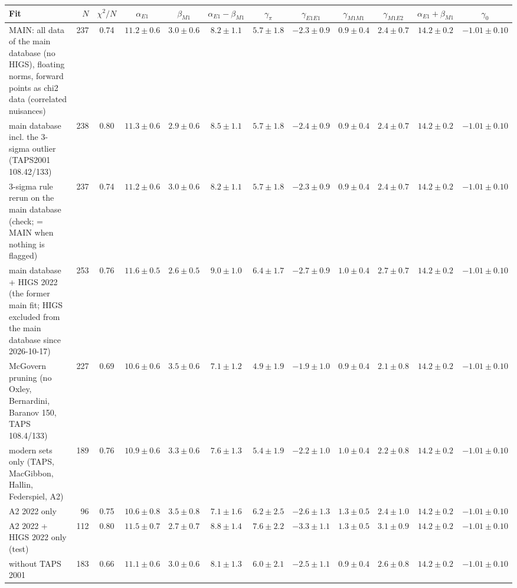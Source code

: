 \begin{tabular}{l r c cccc ccc cc}
\hline
Fit & $N$ & $\chi^2/N$ & $\alpha_{E1}$ & $\beta_{M1}$ & $\alpha_{E1}-\beta_{M1}$ & $\gamma_\pi$ & $\gamma_{E1E1}$ & $\gamma_{M1M1}$ & $\gamma_{M1E2}$ & $\alpha_{E1}+\beta_{M1}$ & $\gamma_0$\\\hline
MAIN: all data of the main database (no HIGS), floating norms, forward points as chi2 data (correlated nuisances) & 237 & 0.74 & $11.2\pm0.6$ & $3.0\pm0.6$ & $8.2\pm1.1$ & $5.7\pm1.8$ & $-2.3\pm0.9$ & $0.9\pm0.4$ & $2.4\pm0.7$ & $14.2\pm0.2$ & $-1.01\pm0.10$\\
main database incl. the 3-sigma outlier (TAPS2001 108.42/133) & 238 & 0.80 & $11.3\pm0.6$ & $2.9\pm0.6$ & $8.5\pm1.1$ & $5.7\pm1.8$ & $-2.4\pm0.9$ & $0.9\pm0.4$ & $2.4\pm0.7$ & $14.2\pm0.2$ & $-1.01\pm0.10$\\
3-sigma rule rerun on the main database (check; = MAIN when nothing is flagged) & 237 & 0.74 & $11.2\pm0.6$ & $3.0\pm0.6$ & $8.2\pm1.1$ & $5.7\pm1.8$ & $-2.3\pm0.9$ & $0.9\pm0.4$ & $2.4\pm0.7$ & $14.2\pm0.2$ & $-1.01\pm0.10$\\
main database + HIGS 2022 (the former main fit; HIGS excluded from the main database since 2026-10-17) & 253 & 0.76 & $11.6\pm0.5$ & $2.6\pm0.5$ & $9.0\pm1.0$ & $6.4\pm1.7$ & $-2.7\pm0.9$ & $1.0\pm0.4$ & $2.7\pm0.7$ & $14.2\pm0.2$ & $-1.01\pm0.10$\\
McGovern pruning (no Oxley, Bernardini, Baranov 150, TAPS 108.4/133) & 227 & 0.69 & $10.6\pm0.6$ & $3.5\pm0.6$ & $7.1\pm1.2$ & $4.9\pm1.9$ & $-1.9\pm1.0$ & $0.9\pm0.4$ & $2.1\pm0.8$ & $14.2\pm0.2$ & $-1.01\pm0.10$\\
modern sets only (TAPS, MacGibbon, Hallin, Federspiel, A2) & 189 & 0.76 & $10.9\pm0.6$ & $3.3\pm0.6$ & $7.6\pm1.3$ & $5.4\pm1.9$ & $-2.2\pm1.0$ & $1.0\pm0.4$ & $2.2\pm0.8$ & $14.2\pm0.2$ & $-1.01\pm0.10$\\
A2 2022 only & 96 & 0.75 & $10.6\pm0.8$ & $3.5\pm0.8$ & $7.1\pm1.6$ & $6.2\pm2.5$ & $-2.6\pm1.3$ & $1.3\pm0.5$ & $2.4\pm1.0$ & $14.2\pm0.2$ & $-1.01\pm0.10$\\
A2 2022 + HIGS 2022 only (test) & 112 & 0.80 & $11.5\pm0.7$ & $2.7\pm0.7$ & $8.8\pm1.4$ & $7.6\pm2.2$ & $-3.3\pm1.1$ & $1.3\pm0.5$ & $3.1\pm0.9$ & $14.2\pm0.2$ & $-1.01\pm0.10$\\
without TAPS 2001 & 183 & 0.66 & $11.1\pm0.6$ & $3.0\pm0.6$ & $8.1\pm1.3$ & $6.0\pm2.1$ & $-2.5\pm1.1$ & $0.9\pm0.4$ & $2.6\pm0.8$ & $14.2\pm0.2$ & $-1.01\pm0.10$\\

\end{tabular}
